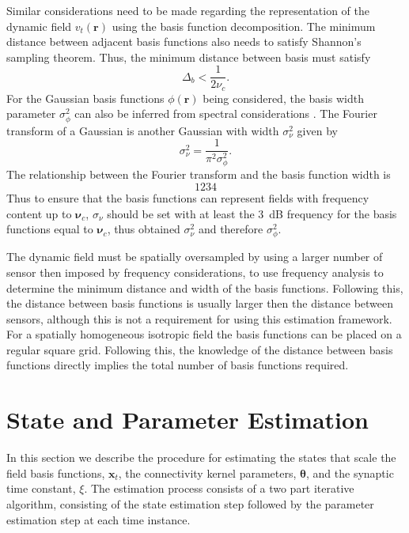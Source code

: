 \documentclass[12pt]{iopart}		%
\begin{document}
Similar considerations need to be made regarding the representation of the dynamic field $v_t(\mathbf{r})$ using the basis function decomposition. The minimum distance between adjacent basis functions also needs to satisfy Shannon's sampling theorem. Thus, the minimum distance between basis must satisfy
\begin{equation}
\Delta_b < \frac{1}{2\nu_c}.
\end{equation}
For the Gaussian basis functions $\phi(\mathbf{r})$ being considered, the basis width parameter $\sigma_{\phi}^2$ can also be inferred from spectral considerations \cite{Sanner1992,Scerri2009}. The Fourier transform of a Gaussian is another Gaussian with width $\sigma^2_{\nu}$ given by
\begin{equation}
\sigma^2_{\nu} = \frac{1}{\pi^2\sigma_{\phi}^2}.
\end{equation}
The relationship between the Fourier transform and the basis function width is
\begin{equation}
	1234
\end{equation}
Thus to ensure that the basis functions can represent fields with frequency content up to $\boldsymbol{\nu}_c$, $\sigma_{\nu}$ should be set with at least the 3~dB frequency for the basis functions equal to $\boldsymbol{\nu}_c$, thus obtained $\sigma^2_{\nu}$ and therefore $\sigma_{\phi}^2$.

The dynamic field must be spatially oversampled by using a larger number of sensor then imposed by frequency considerations, to use frequency analysis to determine the minimum distance and width of the basis functions. Following this, the distance between basis functions is usually larger then the distance between sensors, although this is not a requirement for using this estimation framework. For a spatially homogeneous isotropic field the basis functions can be placed on a regular square grid. Following this, the knowledge of the distance between basis functions directly implies the total number of basis functions required.
% 
\section{State and Parameter Estimation}\label{StateAndParameterEstimationSection}
In this section we describe the procedure for estimating the states that scale the field basis functions, $\mathbf{x}_t$, the connectivity kernel parameters, $\boldsymbol \theta$, and the synaptic time constant, $\xi$. The estimation process consists of a two part iterative algorithm, consisting of the state estimation step followed by the parameter estimation step at each time instance.  
\end{document}
